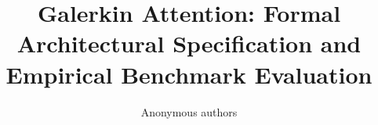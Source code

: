 \title{\textbf{Galerkin Attention: Formal Architectural Specification and Empirical Benchmark Evaluation}}

\author{Anonymous authors}
